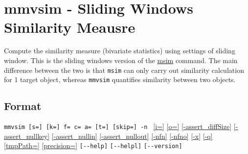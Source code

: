 
%

\section{mmvsim - Sliding Windows Similarity Meausre\label{sect:mmvsim}}

Compute the similarity measure (bivariate statistics) using settings of sliding window. This is the sliding windows version of the \hyperref[sect:msim]{msim} command. The main difference between the two is that \verb|msim| can only carry out similarity calculation for 1 target object, whereas \verb|mmvsim| quantifies similarity between two objects.    


\subsection*{Format}
\verb|mmvsim [s=] [k=] f= c= a= [t=] [skip=] -n |
\hyperref[sect:option_i]{[i=]}
\hyperref[sect:option_o]{[o=]}
\hyperref[sect:option_assert_diffSize]{[-assert\_diffSize]}
\hyperref[sect:option_assert_nullkey]{[-assert\_nullkey]}
\hyperref[sect:option_assert_nullin]{[-assert\_nullin]}
\hyperref[sect:option_assert_nullout]{[-assert\_nullout]}
\hyperref[sect:option_nfn]{[-nfn]} 
\hyperref[sect:option_nfno]{[-nfno]}  
\hyperref[sect:option_x]{[-x]}
\hyperref[sect:option_q]{[-q]}
\hyperref[sect:option_option_tmppath]{[tmpPath=]}
\hyperref[sect:option_precision]{[precision=]}
\verb|[--help]|
\verb|[--helpl]|
\verb|[--version]|\\

